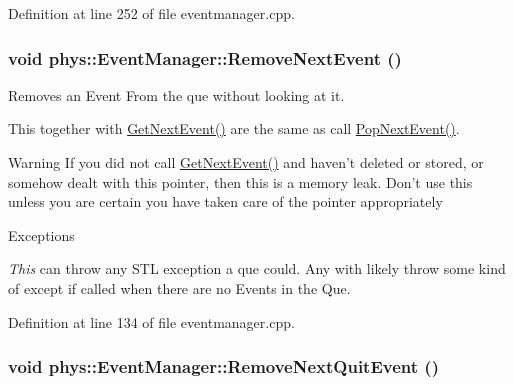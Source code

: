Definition at line 252 of file eventmanager.cpp.

\hypertarget{classphys_1_1EventManager_a2389a44d199f121e1fea741f83248513}{
\subsubsection[{RemoveNextEvent}]{\setlength{\rightskip}{0pt plus 5cm}void phys::EventManager::RemoveNextEvent ()}}
\label{da/dde/classphys_1_1EventManager_a2389a44d199f121e1fea741f83248513}


Removes an Event From the que without looking at it. 

This together with \hyperlink{classphys_1_1EventManager_aa0937763961aefc59aea197a8f9bc0dc}{GetNextEvent()} are the same as call \hyperlink{classphys_1_1EventManager_ae403b203bc425744377ec5fc311f4e5d}{PopNextEvent()}. \begin{DoxyWarning}{Warning}
If you did not call \hyperlink{classphys_1_1EventManager_aa0937763961aefc59aea197a8f9bc0dc}{GetNextEvent()} and haven't deleted or stored, or somehow dealt with this pointer, then this is a memory leak. Don't use this unless you are certain you have taken care of the pointer appropriately 
\end{DoxyWarning}

\begin{DoxyExceptions}{Exceptions}
\item[{\em This}]can throw any STL exception a que could. Any with likely throw some kind of except if called when there are no Events in the Que. \end{DoxyExceptions}


Definition at line 134 of file eventmanager.cpp.

\hypertarget{classphys_1_1EventManager_a5031871aa6e044764ec2963228f735dd}{
\subsubsection[{RemoveNextQuitEvent}]{\setlength{\rightskip}{0pt plus 5cm}void phys::EventManager::RemoveNextQuitEvent ()}}
\label{da/dde/classphys_1_1EventManager_a5031871aa6e044764ec2963228f735dd}



